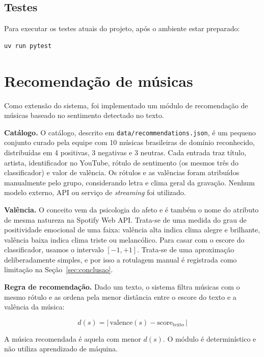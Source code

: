 \documentclass[11pt,a4paper]{article}
\newenvironment{addedblock}{\par\color{newblue}}{\par\color{black}}
\begin{document}
\subsection*{Testes}

Para executar os testes atuais do projeto, após o ambiente estar preparado:

\begin{verbatim}
uv run pytest
\end{verbatim}

\begin{addedblock}
\section{Recomendação de músicas}

Como extensão do sistema, foi implementado um módulo de recomendação de músicas baseado no sentimento detectado no texto.

\textbf{Catálogo.} O catálogo, descrito em \texttt{data/recommendations.json}, é um pequeno conjunto curado pela equipe com 10 músicas brasileiras de domínio reconhecido, distribuídas em 4 positivas, 3 negativas e 3 neutras. Cada entrada traz título, artista, identificador no YouTube, rótulo de sentimento (os mesmos três do classificador) e valor de valência. Os rótulos e as valências foram atribuídos manualmente pelo grupo, considerando letra e clima geral da gravação. Nenhum modelo externo, API ou serviço de \emph{streaming} foi utilizado.

\textbf{Valência.} O conceito vem da psicologia do afeto \citep{russell1980circumplex} e é também o nome do atributo de mesma natureza na Spotify Web API. Trata-se de uma medida do grau de positividade emocional de uma faixa: valência alta indica clima alegre e brilhante, valência baixa indica clima triste ou melancólico. Para casar com o escore do classificador, usamos o intervalo $[-1, +1]$. Trata-se de uma aproximação deliberadamente simples, e por isso a rotulagem manual é registrada como limitação na Seção~\ref{sec:conclusao}.

\textbf{Regra de recomendação.} Dado um texto, o sistema filtra músicas com o mesmo rótulo e as ordena pela menor distância entre o escore do texto e a valência da música:

\begin{equation}
d(s) = |\,\text{valence}(s) - \text{score}_{\text{texto}}\,|
\end{equation}

A música recomendada é aquela com menor $d(s)$. O módulo é determinístico e não utiliza aprendizado de máquina.


\end{addedblock}
\end{document}
